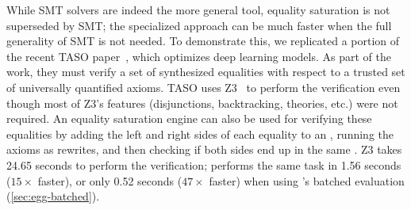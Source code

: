 While SMT solvers are indeed the more general tool,
  equality saturation is not superseded by SMT;
  the specialized approach can be much faster when the full generality of SMT is
  not needed.
To demonstrate this, we replicated a portion of the recent TASO paper~\cite{taso},
  which optimizes deep learning models.
As part of the work, they must verify a set of synthesized equalities with
  respect to a trusted set of universally quantified axioms.
TASO uses Z3~\cite{z3} to perform the
  verification even though most of Z3's features
  (disjunctions, backtracking, theories, etc.)
  were not required.
An equality saturation engine can also be used for verifying these equalities
  by adding the left and right sides of
  each equality to an \egraph,
  running the axioms as rewrites,
  and then checking if both sides end up in the same \eclass.
Z3 takes 24.65 seconds to perform the verification;
  \egg performs the same task in 1.56 seconds ($15\times$ faster),
  or only 0.52 seconds ($47\times$ faster) when using
  \egg's batched evaluation (\autoref{sec:egg-batched}).





